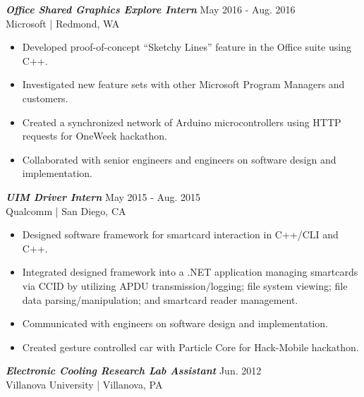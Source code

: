 \documentclass[letter]{res}
\begin{document}
\begin{resume}
\vspace{-2mm}

{\sl \textbf{Office Shared Graphics Explore Intern}} \hfill May 2016 - Aug. 2016\\
Microsoft | Redmond, WA \newline
 \vspace{-4mm}
  \begin{itemize}
  \item Developed proof-of-concept ``Sketchy Lines'' feature in the Office suite using C++.
  \item Investigated new feature sets with other Microsoft Program Managers and customers.
  \item Created a synchronized network of Arduino microcontrollers using HTTP requests for OneWeek hackathon.
  \item Collaborated with senior engineers and engineers on software design and implementation.
  \end{itemize}

\vspace{-2mm}

{\sl \textbf{UIM Driver Intern}} \hfill May 2015 - Aug. 2015\\
Qualcomm | San Diego, CA \newline

 \vspace{-4mm}

 \begin{itemize}
 \item Designed software framework for smartcard interaction in C++/CLI and C++.
 \item Integrated designed framework into a .NET application managing smartcards via CCID by utilizing APDU transmission/logging; file system viewing; file data parsing/manipulation; and smartcard reader management.
 \item Communicated with engineers on software design and implementation.
 \item Created gesture controlled car with Particle Core for Hack-Mobile hackathon.
 \end{itemize}

\vspace{-2mm}

{\sl \textbf{Electronic Cooling Research Lab Assistant}} \hfill Jun. 2012\\
Villanova University | Villanova, PA \newline

 \vspace{-4mm}


\end{resume}
\end{document}
